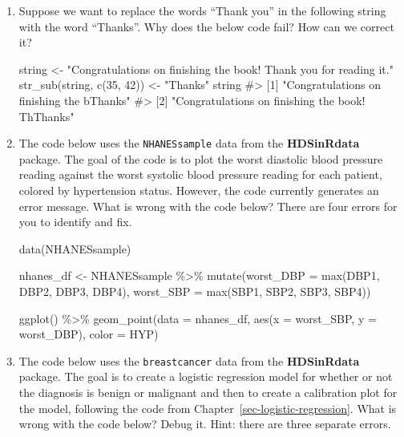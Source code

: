 \documentclass[
  letterpaper,
]{krantz}
\makeatletter
\newenvironment{Shaded}{\begin{snugshade}}{\end{snugshade}}
\newcommand{\AttributeTok}[1]{\textcolor[rgb]{0.40,0.45,0.13}{#1}}
\newcommand{\CommentTok}[1]{\textcolor[rgb]{0.37,0.37,0.37}{#1}}
\newcommand{\DecValTok}[1]{\textcolor[rgb]{0.68,0.00,0.00}{#1}}
\newcommand{\FunctionTok}[1]{\textcolor[rgb]{0.28,0.35,0.67}{#1}}
\newcommand{\NormalTok}[1]{\textcolor[rgb]{0.00,0.23,0.31}{#1}}
\newcommand{\OtherTok}[1]{\textcolor[rgb]{0.00,0.23,0.31}{#1}}
\newcommand{\SpecialCharTok}[1]{\textcolor[rgb]{0.37,0.37,0.37}{#1}}
\newcommand{\StringTok}[1]{\textcolor[rgb]{0.13,0.47,0.30}{#1}}
\newenvironment{kframe}{%
\medskip{}
\setlength{\fboxsep}{.8em}
 \def\at@end@of@kframe{}%
 \ifinner\ifhmode%
  \def\at@end@of@kframe{\end{minipage}}%
  \begin{minipage}{\columnwidth}%
 \fi\fi%
 \def\FrameCommand##1{\hskip\@totalleftmargin \hskip-\fboxsep
 \colorbox{shadecolor}{##1}\hskip-\fboxsep
     \hskip-\linewidth \hskip-\@totalleftmargin \hskip\columnwidth}%
 \MakeFramed {\advance\hsize-\width
   \@totalleftmargin\z@ \linewidth\hsize
   \@setminipage}}%
 {\par\unskip\endMakeFramed%
 \at@end@of@kframe}
\renewenvironment{Shaded}{\begin{kframe}}{\end{kframe}}
\makeatother
\begin{document}
\begin{enumerate}
\def\labelenumi{\arabic{enumi}.}
\item
  Suppose we want to replace the words ``Thank you'' in the following
  string with the word ``Thanks''. Why does the below code fail? How can
  we correct it?

\begin{Shaded}
\begin{Highlighting}[]
\NormalTok{string }\OtherTok{\textless{}{-}} \StringTok{"Congratulations on finishing the book! Thank you for reading it."}
\FunctionTok{str\_sub}\NormalTok{(string, }\FunctionTok{c}\NormalTok{(}\DecValTok{35}\NormalTok{, }\DecValTok{42}\NormalTok{)) }\OtherTok{\textless{}{-}} \StringTok{"Thanks"}
\NormalTok{string}
\CommentTok{\#\textgreater{} [1] "Congratulations on finishing the bThanks"       }
\CommentTok{\#\textgreater{} [2] "Congratulations on finishing the book! ThThanks"}
\end{Highlighting}
\end{Shaded}
\item
  The code below uses the \texttt{NHANESsample} data from the
  \textbf{HDSinRdata} package. The goal of the code is to plot the worst
  diastolic blood pressure reading against the worst systolic blood
  pressure reading for each patient, colored by hypertension status.
  However, the code currently generates an error message. What is wrong
  with the code below? There are four errors for you to identify and
  fix.

\begin{Shaded}
\begin{Highlighting}[]
\FunctionTok{data}\NormalTok{(NHANESsample)}

\NormalTok{nhanes\_df }\OtherTok{\textless{}{-}}\NormalTok{ NHANESsample }\SpecialCharTok{\%\textgreater{}\%} \FunctionTok{mutate}\NormalTok{(}\AttributeTok{worst\_DBP =} \FunctionTok{max}\NormalTok{(DBP1, DBP2, DBP3, DBP4),}
                                 \AttributeTok{worst\_SBP =} \FunctionTok{max}\NormalTok{(SBP1, SBP2, SBP3, SBP4))}

\FunctionTok{ggplot}\NormalTok{() }\SpecialCharTok{\%\textgreater{}\%} \FunctionTok{geom\_point}\NormalTok{(}\AttributeTok{data =}\NormalTok{ nhanes\_df, }\FunctionTok{aes}\NormalTok{(}\AttributeTok{x =}\NormalTok{ worst\_SBP, }\AttributeTok{y =}\NormalTok{ worst\_DBP), }
                    \AttributeTok{color =}\NormalTok{ HYP)}
\end{Highlighting}
\end{Shaded}
\item
  The code below uses the \texttt{breastcancer} data from the
  \textbf{HDSinRdata} package. The goal is to create a logistic
  regression model for whether or not the diagnosis is benign or
  malignant and then to create a calibration plot for the model,
  following the code from Chapter~\ref{sec-logistic-regression}. What is
  wrong with the code below? Debug it. Hint: there are three separate
  errors.


\end{enumerate}
\end{document}
